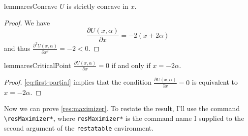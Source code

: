 \documentclass[12pt]{article}
\begin{document}
\begin{restatable}{lemma}{resConcave}
  \label{res:concave}
  $U$ is strictly concave in $x$.
\end{restatable}

\begin{proof}
  We have
  \begin{equation}
    \label{eq:first-partial}
    \frac{\partial U(x, \alpha)}{\partial x} = -2 (x + 2 \alpha)
  \end{equation}
  and thus $\frac{\partial^2 U(x, \alpha)}{\partial x^2} = -2 < 0$.
\end{proof}

\begin{restatable}{lemma}{resCriticalPoint}
  \label{res:critical-point}
  $\frac{\partial U(x, \alpha)}{\partial x} = 0$ if and only if $x = -2 \alpha$.
\end{restatable}

\begin{proof}
  \autoref{eq:first-partial} implies that the condition $\frac{\partial U(x, \alpha)}{\partial x} = 0$ is equivalent to $x = -2 \alpha$.
\end{proof}

Now we can prove \autoref{res:maximizer}.
To restate the result, I'll use the command \verb|\resMaximizer*|, where \verb|resMaximizer*| is the command name I supplied to the second argument of the \verb|restatable| environment.

\resMaximizer*

{}
\singlespacing
{}
\end{document}
